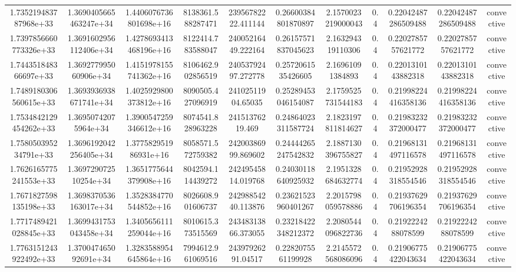 \begin{table}
\begin{tabular}{ccccccccccc}
1.735219483787968e+33 & 1.3690405665463247e+34 & 1.4406076736801698e+16 & 8138361.588287471 & 23956782222.411144 & 0.26600384801870897 & 2.1570023219000043 & 0.4 & 0.22042487286509488 & 0.22042487286509488 & convective \\
1.7397856660773326e+33 & 1.3691602956112406e+34 & 1.4278693413468196e+16 & 8122414.783588047 & 24005216449.222164 & 0.26157571837045623 & 2.163294319110306 & 0.4 & 0.2202785757621772 & 0.2202785757621772 & convective \\
1.744351848366697e+33 & 1.369277995060906e+34 & 1.4151978155741362e+16 & 8106462.902856519 & 24053792497.272778 & 0.2572061535426605 & 2.16961091384893 & 0.4 & 0.2201310143882318 & 0.2201310143882318 & convective \\
1.7489180306560615e+33 & 1.3693936938671741e+34 & 1.4025929800373812e+16 & 8090505.427096919 & 24102511904.65035 & 0.25289453046154087 & 2.1759525731544183 & 0.4 & 0.21998224416358136 & 0.21998224416358136 & convective \\
1.7534842129454262e+33 & 1.36950742075964e+34 & 1.3900547259346612e+16 & 8074541.828963228 & 24151376219.469 & 0.24864023311587724 & 2.1823197811814627 & 0.4 & 0.21983232372000477 & 0.21983232372000477 & convective \\
1.758050395234791e+33 & 1.3696192042256405e+34 & 1.377582951986931e+16 & 8058571.572759382 & 24200386999.869602 & 0.24444265247542832 & 2.1887130396755827 & 0.4 & 0.21968131497116578 & 0.21968131497116578 & convective \\
1.7626165775241553e+33 & 1.369729072510254e+34 & 1.3651775644379908e+16 & 8042594.114439272 & 24249545814.019768 & 0.24030118640925932 & 2.1951328684632774 & 0.4 & 0.21952928318554546 & 0.21952928318554546 & convective \\
1.7671827598135198e+33 & 1.3698370536163017e+34 & 1.3528384770544852e+16 & 8026608.901606737 & 24298854240.113876 & 0.23621523960401267 & 2.2015798059578886 & 0.4 & 0.21937629706196354 & 0.21937629706196354 & convective \\
1.7717489421028845e+33 & 1.3699431753043458e+34 & 1.3405656111259044e+16 & 8010615.373515569 & 24348313866.373055 & 0.23218422348212372 & 2.2080544096822736 & 0.4 & 0.2192224288078599 & 0.2192224288078599 & convective \\
1.7763151243922492e+33 & 1.370047465092691e+34 & 1.3283588954645864e+16 & 7994612.961069516 & 24397926291.04517 & 0.2282075561199928 & 2.2145572568086096 & 0.4 & 0.21906775422043634 & 0.21906775422043634 & convective \\

\end{tabular}
\end{table}
